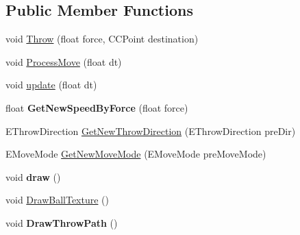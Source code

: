 \subsection*{Public Member Functions}
\begin{DoxyCompactItemize}
\item 
void \hyperlink{class_j_g___ball_a58db2f725890ccc7099618aeec121022}{Throw} (float force, C\-C\-Point destination)
\item 
void \hyperlink{class_j_g___ball_acb61a2ff0b709cad8302935df73fca50}{Process\-Move} (float dt)
\item 
void \hyperlink{class_j_g___ball_a21c06d1a10aa8fdcc3d8e63a82f221fe}{update} (float dt)
\item 
\hypertarget{class_j_g___ball_ab8f9a9eb9c44dd5f54220a400f20ca73}{float {\bfseries Get\-New\-Speed\-By\-Force} (float force)}\label{class_j_g___ball_ab8f9a9eb9c44dd5f54220a400f20ca73}

\item 
E\-Throw\-Direction \hyperlink{class_j_g___ball_a37fb865cb8d888be18bac222fd3d329c}{Get\-New\-Throw\-Direction} (E\-Throw\-Direction pre\-Dir)
\item 
E\-Move\-Mode \hyperlink{class_j_g___ball_afa4c297cf6304a75c1744493bd35377e}{Get\-New\-Move\-Mode} (E\-Move\-Mode pre\-Move\-Mode)
\item 
\hypertarget{class_j_g___ball_a0ec0b664c7b925e6cca4ea91a26bca70}{void {\bfseries draw} ()}\label{class_j_g___ball_a0ec0b664c7b925e6cca4ea91a26bca70}

\item 
void \hyperlink{class_j_g___ball_ac856b7c263358d42f4a77dc080125b4c}{Draw\-Ball\-Texture} ()
\item 
\hypertarget{class_j_g___ball_a504d0786eddf6bce4e142bc5ef21f1ab}{void {\bfseries Draw\-Throw\-Path} ()}\label{class_j_g___ball_a504d0786eddf6bce4e142bc5ef21f1ab}


\end{DoxyCompactItemize}
